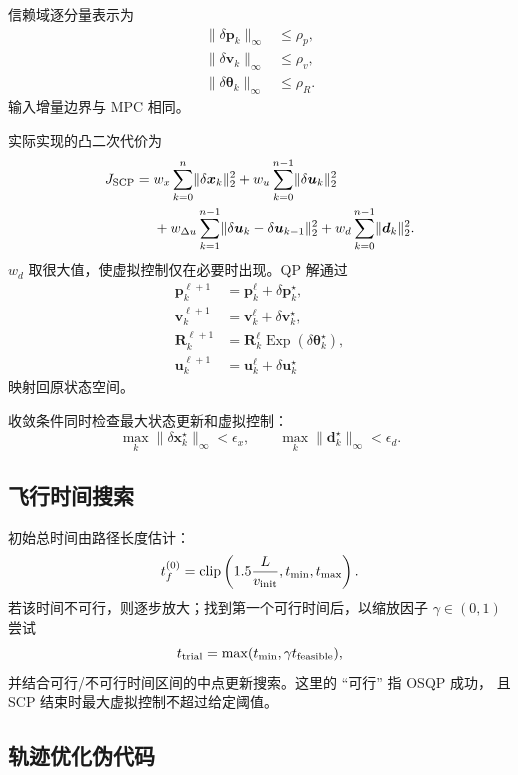 \documentclass[UTF8,a4paper,11pt]{ctexart}
\newcommand{\Exp}{\operatorname{Exp}}
\newcommand{\clip}{\operatorname{clip}}
\begin{document}
信赖域逐分量表示为
\begin{align}
  \lVert\delta\bm p_k\rVert_\infty&\leq\rho_p,\\
  \lVert\delta\bm v_k\rVert_\infty&\leq\rho_v,\\
  \lVert\delta\bm\theta_k\rVert_\infty&\leq\rho_R.
\end{align}
输入增量边界与 MPC 相同。

实际实现的凸二次代价为
\begin{align}
  J_{\rm SCP}={}&
  w_x\sum_{k=0}^{n}\lVert\delta\bm x_k\rVert_2^2
  +w_u\sum_{k=0}^{n-1}\lVert\delta\bm u_k\rVert_2^2\\
  &+w_{\Delta u}\sum_{k=1}^{n-1}
  \lVert\delta\bm u_k-\delta\bm u_{k-1}\rVert_2^2
  +w_d\sum_{k=0}^{n-1}\lVert\bm d_k\rVert_2^2.
  \label{eq:scp_cost}
\end{align}
$w_d$ 取很大值，使虚拟控制仅在必要时出现。QP 解通过
\begin{align}
  \bm p_k^{\ell+1}&=\bm p_k^\ell+\delta\bm p_k^\star,\\
  \bm v_k^{\ell+1}&=\bm v_k^\ell+\delta\bm v_k^\star,\\
  \bm R_k^{\ell+1}&=\bm R_k^\ell\Exp(\delta\bm\theta_k^\star),\\
  \bm u_k^{\ell+1}&=\bm u_k^\ell+\delta\bm u_k^\star
\end{align}
映射回原状态空间。

收敛条件同时检查最大状态更新和虚拟控制：
\begin{equation}
  \max_k\lVert\delta\bm x_k^\star\rVert_\infty<\epsilon_x,
  \qquad
  \max_k\lVert\bm d_k^\star\rVert_\infty<\epsilon_d.
\end{equation}

\subsection{飞行时间搜索}

初始总时间由路径长度估计：
\begin{equation}
  t_f^{(0)}=\clip
  \left(1.5\frac{L}{v_{\rm init}},t_{\min},t_{\max}\right).
\end{equation}
若该时间不可行，则逐步放大；找到第一个可行时间后，以缩放因子
$\gamma\in(0,1)$ 尝试
\begin{equation}
  t_{\rm trial}=\max(t_{\min},\gamma t_{\rm feasible}),
\end{equation}
并结合可行/不可行时间区间的中点更新搜索。这里的 ``可行'' 指 OSQP 成功，
且 SCP 结束时最大虚拟控制不超过给定阈值。

\subsection{轨迹优化伪代码}
\end{document}
